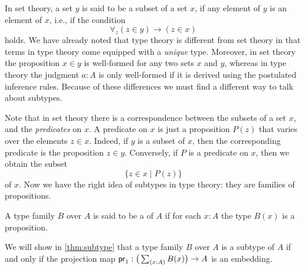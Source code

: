   In set theory, a set $y$ is said to be a subset of a set $x$, if any element of $y$ is an element of $x$, i.e., if the condition
  \begin{equation*}
    \forall_z (z\in y)\to (z\in x)
  \end{equation*}
  holds. We have already noted that type theory is different from set theory in that terms in type theory come equipped with a \emph{unique} type. Moreover, in set theory the proposition $x\in y$ is well-formed for any two sets $x$ and $y$, whereas in type theory the judgment $a:A$ is only well-formed if it is derived using the postulated inference rules. Because of these differences we must find a different way to talk about subtypes.

  Note that in set theory there is a correspondence between the subsets of a set $x$, and the \emph{predicates} on $x$. A predicate on $x$ is just a proposition $P(z)$ that varies over the elements $z\in x$. Indeed, if $y$ is a subset of $x$, then the corresponding predicate is the proposition $z\in y$. Conversely, if $P$ is a predicate on $x$, then we obtain the subset
  \begin{equation*}
    \{z\in x\mid P(z)\}
  \end{equation*}
  of $x$. Now we have the right idea of subtypes in type theory: they are families of propositions.

\begin{defn}
A type family $B$ over $A$ is said to be a  of $A$ if for each $x:A$ the type $B(x)$ is a proposition.
\end{defn}

We will show in \cref{thm:subtype} that a type family $B$ over $A$ is a subtype of $A$ if and only if the projection map $\proj 1:\big(\sm{x:A}B(x)\big)\to A$ is an embedding.

